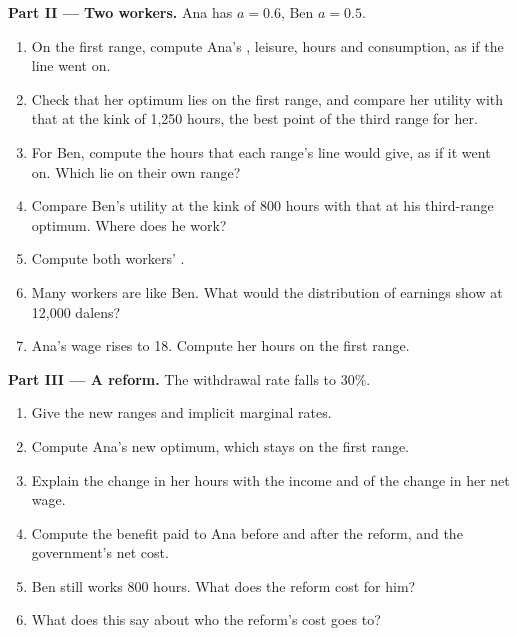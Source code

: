 \begin{problem}
\medskip\noindent\textbf{Part II --- Two workers.} Ana has $a = 0.6$, Ben $a = 0.5$.
\begin{enumerate}[resume]
  \item On the first range, compute Ana's , leisure, hours and consumption, as if the line went on.
  \item Check that her optimum lies on the first range, and compare her utility with that at the kink of 1,250 hours, the best point of the third range for her.
  \item For Ben, compute the hours that each range's line would give, as if it went on. Which lie on their own range?
  \item Compare Ben's utility at the kink of 800 hours with that at his third-range optimum. Where does he work?
  \item Compute both workers' .
  \item Many workers are like Ben. What would the distribution of earnings show at 12,000 dalens?
  \item Ana's wage rises to 18. Compute her hours on the first range.
\end{enumerate}

\medskip\noindent\textbf{Part III --- A reform.} The withdrawal rate falls to $30\%$.
\begin{enumerate}[resume]
  \item Give the new ranges and implicit marginal rates.
  \item Compute Ana's new optimum, which stays on the first range.
  \item Explain the change in her hours with the income and  of the change in her net wage.
  \item Compute the benefit paid to Ana before and after the reform, and the government's net cost.
  \item Ben still works 800 hours. What does the reform cost for him?
  \item What does this say about who the reform's cost goes to?
\end{enumerate}


\end{problem}

